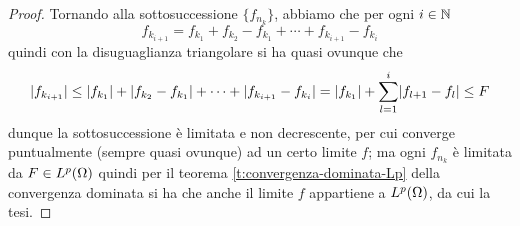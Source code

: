 \begin{proof}
    Tornando alla sottosuccessione $\{f_{n_k}\}$, abbiamo che per ogni $i\in\N$
    \begin{equation}
        f_{k_{i+1}}=f_{k_1}+f_{k_2}-f_{k_1}+\dotsb+f_{k_{i+1}}-f_{k_i}
    \end{equation}
    quindi con la disuguaglianza triangolare si ha quasi ovunque che
    \begin{equation}
        \abs{f_{k_{i+1}}} \le \abs{f_{k_1}}+\abs{f_{k_2}-f_{k_1}}+\dotsb+\abs{f_{k_{i+1}}-f_{k_i}} = \abs{f_{k_1}}+\sum_{l=1}^i\abs{f_{l+1}-f_l} \le F
    \end{equation}
    dunque la sottosuccessione è limitata e non decrescente, per cui converge puntualmente (sempre quasi ovunque) ad un certo limite $f$; ma ogni $f_{n_k}$ è limitata da $F\in\leb[p]{\Omega}$ quindi per il teorema \ref{t:convergenza-dominata-Lp} della convergenza dominata si ha che anche il limite $f$ appartiene a $\leb[p]{\Omega}$, da cui la tesi.
\end{proof}
